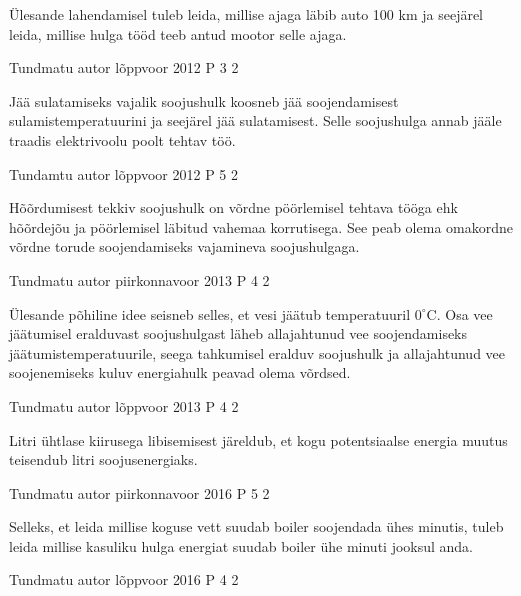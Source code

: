 \documentclass[11pt]{article}
\begin{document}
{{\ifHint
Ülesande lahendamisel tuleb leida, millise ajaga läbib auto 100 km ja seejärel leida, millise hulga tööd teeb antud mootor selle ajaga.
\fi
}

{Tundmatu autor} %
{lõppvoor} %
{2012} %
{P 3} %
{2} %
{

\ifHint
Jää sulatamiseks vajalik soojushulk koosneb jää soojendamisest sulamistemperatuurini ja seejärel jää sulatamisest. Selle soojushulga annab jääle traadis elektrivoolu poolt tehtav töö.
\fi
}

{Tundamtu autor} %
{lõppvoor} %
{2012} %
{P 5} %
{2} %
{

\ifHint
Hõõrdumisest tekkiv soojushulk on võrdne pöörlemisel tehtava tööga ehk hõõrdejõu ja pöörlemisel läbitud vahemaa korrutisega. See peab olema omakordne võrdne torude soojendamiseks vajamineva soojushulgaga.
\fi
}

{Tundmatu autor} %
{piirkonnavoor} %
{2013} %
{P 4} %
{2} %
{

\ifHint
Ülesande põhiline idee seisneb selles, et vesi jäätub temperatuuril $0 ^{\circ}$C. Osa vee jäätumisel eralduvast soojushulgast läheb allajahtunud vee soojendamiseks jäätumistemperatuurile, seega tahkumisel eralduv soojushulk ja allajahtunud vee soojenemiseks kuluv energiahulk peavad olema võrdsed.
\fi
}

{Tundmatu autor} %
{lõppvoor} %
{2013} %
{P 4} %
{2} %
{

\ifHint
Litri ühtlase kiirusega libisemisest järeldub, et kogu potentsiaalse energia muutus teisendub litri soojusenergiaks. 
\fi
}

{Tundmatu autor} %
{piirkonnavoor} %
{2016} %
{P 5} %
{2} %
{

\ifHint
Selleks, et leida millise koguse vett suudab boiler soojendada ühes minutis, tuleb leida millise kasuliku hulga energiat suudab boiler ühe minuti jooksul anda.
\fi
}


{Tundmatu autor} %
{lõppvoor} %
{2016} %
{P 4} %
{2} %
{

}}
\end{document}
